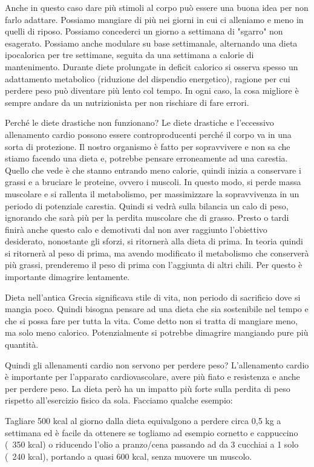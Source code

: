 \documentclass[12pt]{book} %
\begin{document}
Anche in questo caso dare più stimoli al corpo può essere una buona idea per non farlo adattare. Possiamo mangiare di più nei giorni in cui ci alleniamo e meno in quelli di riposo. Possiamo concederci un giorno a settimana di "sgarro" non esagerato. Possiamo anche modulare su base settimanale, alternando una dieta ipocalorica per tre settimane, seguita da una settimana a calorie di mantenimento. Durante diete prolungate in deficit calorico si osserva spesso un adattamento metabolico (riduzione del dispendio energetico), ragione per cui perdere peso può diventare più lento col tempo. In ogni caso, la cosa migliore è sempre andare da un nutrizionista per non rischiare di fare errori.

Perché le diete drastiche non funzionano?
Le diete drastiche e l'eccessivo allenamento cardio possono essere controproducenti perché il corpo va in una sorta di protezione. Il nostro organismo è fatto per sopravvivere e non sa che stiamo facendo una dieta e, potrebbe pensare erroneamente ad una carestia. Quello che vede è che stanno entrando meno calorie, quindi inizia a conservare i grassi e a bruciare le proteine, ovvero i muscoli. In questo modo, si perde massa muscolare e si rallenta il metabolismo, per massimizzare la sopravvivenza in un periodo di potenziale carestia. Quindi si vedrà sulla bilancia un calo di peso, ignorando che sarà più per la perdita muscolare che di grasso. Presto o tardi finirà anche questo calo e demotivati dal non aver raggiunto l'obiettivo desiderato, nonostante gli sforzi, si ritornerà alla dieta di prima. In teoria quindi si ritornerà al peso di prima, ma avendo modificato il metabolismo che conserverà più grassi, prenderemo il peso di prima con l'aggiunta di altri chili.
Per questo è importante dimagrire lentamente.

Dieta nell'antica Grecia significava stile di vita, non periodo di sacrificio dove si mangia poco. Quindi bisogna pensare ad una dieta che sia sostenibile nel tempo e che si possa fare per tutta la vita. Come detto non si tratta di mangiare meno, ma solo meno calorico. Potenzialmente si potrebbe dimagrire mangiando pure più quantità.

Quindi gli allenamenti cardio non servono per perdere peso?
L'allenamento cardio è importante per l'apparato cardiovascolare, avere più fiato e resistenza e anche per perdere peso. La dieta però ha un impatto più forte sulla perdita di peso rispetto all’esercizio fisico da sola. Facciamo qualche esempio:

Tagliare 500 kcal al giorno dalla dieta equivalgono a perdere circa 0,5 kg a settimana ed è facile da ottenere se togliamo ad esempio cornetto e cappuccino (~350 kcal) o riducendo l'olio a pranzo/cena passando ad da 3 cucchiai a 1 solo (~240 kcal), portando a quasi 600 kcal, senza muovere un muscolo.
\end{document}
